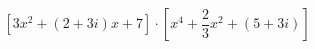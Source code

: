 \documentclass[12pt]{article}
\begin{document}
\sicpsize
\[
\left[3x^2 + (2 + 3i)x + 7 \right] \cdot \left[x^4 + \frac{2}{3} x^2 + (5 + 3i) \right]
\]
\end{document}
